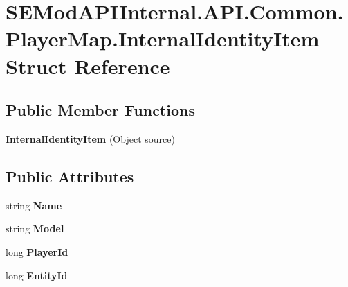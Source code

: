 \hypertarget{struct_s_e_mod_a_p_i_internal_1_1_a_p_i_1_1_common_1_1_player_map_1_1_internal_identity_item}{}\section{S\+E\+Mod\+A\+P\+I\+Internal.\+A\+P\+I.\+Common.\+Player\+Map.\+Internal\+Identity\+Item Struct Reference}
\label{struct_s_e_mod_a_p_i_internal_1_1_a_p_i_1_1_common_1_1_player_map_1_1_internal_identity_item}
\subsection*{Public Member Functions}
\begin{DoxyCompactItemize}
\item 
\hypertarget{struct_s_e_mod_a_p_i_internal_1_1_a_p_i_1_1_common_1_1_player_map_1_1_internal_identity_item_ac86f40c38c650e37b180970cea9def75}{}{\bfseries Internal\+Identity\+Item} (Object source)\label{struct_s_e_mod_a_p_i_internal_1_1_a_p_i_1_1_common_1_1_player_map_1_1_internal_identity_item_ac86f40c38c650e37b180970cea9def75}

\end{DoxyCompactItemize}
\subsection*{Public Attributes}
\begin{DoxyCompactItemize}
\item 
\hypertarget{struct_s_e_mod_a_p_i_internal_1_1_a_p_i_1_1_common_1_1_player_map_1_1_internal_identity_item_a274a5a10ba347926dd0a4e2e0eefc564}{}string {\bfseries Name}\label{struct_s_e_mod_a_p_i_internal_1_1_a_p_i_1_1_common_1_1_player_map_1_1_internal_identity_item_a274a5a10ba347926dd0a4e2e0eefc564}

\item 
\hypertarget{struct_s_e_mod_a_p_i_internal_1_1_a_p_i_1_1_common_1_1_player_map_1_1_internal_identity_item_afd944b4b88b5bcad964f958a0e4babb1}{}string {\bfseries Model}\label{struct_s_e_mod_a_p_i_internal_1_1_a_p_i_1_1_common_1_1_player_map_1_1_internal_identity_item_afd944b4b88b5bcad964f958a0e4babb1}

\item 
\hypertarget{struct_s_e_mod_a_p_i_internal_1_1_a_p_i_1_1_common_1_1_player_map_1_1_internal_identity_item_ad3ef5a64abcfa27888f2dc536ea0e096}{}long {\bfseries Player\+Id}\label{struct_s_e_mod_a_p_i_internal_1_1_a_p_i_1_1_common_1_1_player_map_1_1_internal_identity_item_ad3ef5a64abcfa27888f2dc536ea0e096}

\item 
\hypertarget{struct_s_e_mod_a_p_i_internal_1_1_a_p_i_1_1_common_1_1_player_map_1_1_internal_identity_item_a37430b7d12f390522f42ca7255ae7edb}{}long {\bfseries Entity\+Id}\label{struct_s_e_mod_a_p_i_internal_1_1_a_p_i_1_1_common_1_1_player_map_1_1_internal_identity_item_a37430b7d12f390522f42ca7255ae7edb}

\end{DoxyCompactItemize}


